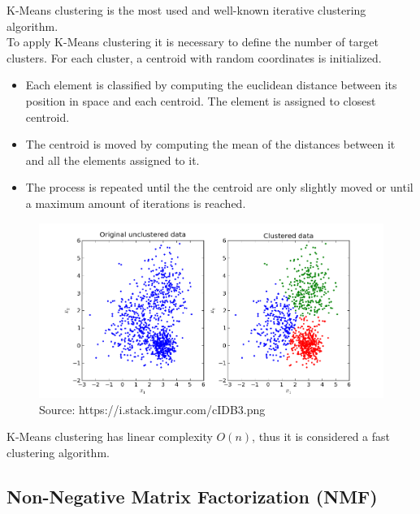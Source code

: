 K-Means clustering is the most used and well-known iterative clustering algorithm.\\
To apply K-Means clustering it is necessary to define the number of target clusters. For each cluster, a centroid with random coordinates is initialized.
\begin{itemize}
\item Each element is classified by computing the euclidean distance between its position in space and each centroid. The element is assigned to closest centroid.
\item The centroid is moved by computing the mean of the distances between it and all the elements assigned to it.
\item The process is repeated until the the centroid are only slightly moved or until a maximum amount of iterations is reached.
\end{itemize}
\begin{figure}[htbp]
	\begin{center}
		\includegraphics[width=\textwidth]{pictures/k-means-clustering}
		\caption{Source: https://i.stack.imgur.com/cIDB3.png}
	\end{center}
\end{figure}
K-Means clustering has linear complexity $O(n)$, thus it is considered a fast clustering algorithm.


\subsection{Non-Negative Matrix Factorization (NMF)}

